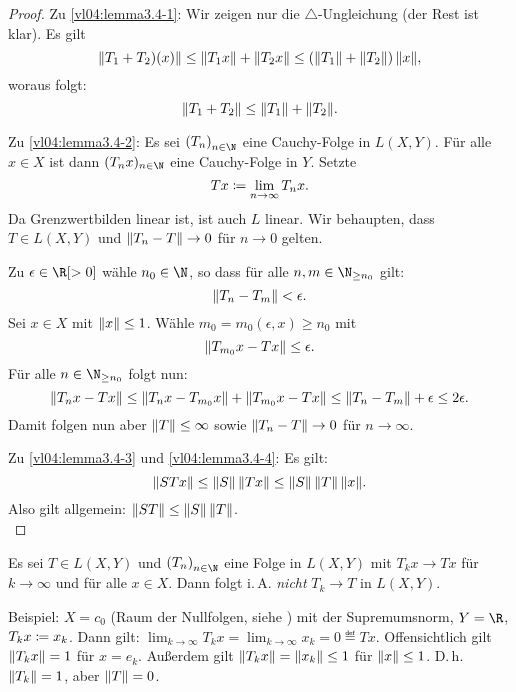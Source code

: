\begin{proof}
    Zu \ref{vl04:lemma3.4-1}: Wir zeigen nur die $\triangle$-Ungleichung (der
    Rest ist klar). Es gilt
    \[ \lVert T_1+T_2)(x)\rVert \leq \lVert T_1x\rVert + \lVert T_2x\rVert
        \leq (\lVert T_1\rVert+\lVert T_2\rVert) \, \lVert x\rVert
    , \]
    woraus folgt:
    \[ \lVert T_1+T_2\rVert \leq \lVert T_1\rVert + \lVert T_2\rVert  . \]
    
    Zu \ref{vl04:lemma3.4-2}: Es sei $\nSeq T$ eine Cauchy-Folge in $L(X,Y)$.
    Für alle $x\in X$ ist dann $(T_n x)_{n\in\N}$ eine Cauchy-Folge in $Y$.
    Setzte
    \[ Tx \coloneqq \lim_{n\to\infty} T_n x  . \]
    Da Grenzwertbilden linear ist, ist auch $L$ linear. Wir behaupten, dass
    $T\in L(X,Y)$ und $\lVert T_n-T\rVert\to0$ für $n\to0$ gelten.
    
    Zu $\epsilon\in\R[>0]$ wähle $n_0\in\N$, so dass für alle 
    $n,m\in\N_{\geq n_0}$ gilt:
    \[ \lVert T_n-T_m\rVert < \epsilon  .\]
    Sei $x\in X$ mit $\lVert x\rVert\leq 1$. Wähle $m_0=m_0(\epsilon,x) \geq n_0$ mit
    \[ \lVert T_{m_0} x - Tx\rVert \leq \epsilon . \]
    Für alle $n\in\N_{\geq n_0}$ folgt nun:
    \[ \lVert T_n x -Tx\rVert \leq \lVert T_n x - T_{m_0} x\rVert + \lVert T_{m_0} x - T x\rVert
        \leq \lVert T_n-T_m\rVert + \epsilon \leq 2\epsilon
    . \]
    Damit folgen nun aber $\lVert T\rVert \leq \infty$ sowie $\lVert T_n-T\rVert\to0$ für
    $n\to\infty$.
    
    Zu \ref{vl04:lemma3.4-3} und \ref{vl04:lemma3.4-4}: Es gilt:
    \[ \lVert STx\rVert \leq \lVert S\rVert \, \lVert Tx\rVert \leq \lVert S\rVert\,\lVert T\rVert\,\lVert x\rVert
    . \]
    Also gilt allgemein: $\lVert ST\rVert \leq \lVert S\rVert\,\lVert T\rVert$.
    \\
\end{proof}

\begin{thBemerkung}
    Es sei $T\in L(X,Y)$ und $\nSeq T$ eine Folge in $L(X,Y)$ mit $T_k x\to Tx$
    für $k\to\infty$ und für alle $x\in X$. Dann folgt i.\,A. \emph{nicht}
    $T_k\to T$ in $L(X,Y)$.
    
    Beispiel: $X=c_0$ 
    (Raum der Nullfolgen, 
    siehe )
    mit der Supremumsnorm, $Y=\R$, $T_kx\coloneqq x_k$.
    Dann gilt: $\lim_{k\to\infty} T_kx = \lim_{k\to\infty} x_k = 0 \eqdef Tx$.
    Offensichtlich gilt $\lVert T_kx\rVert=1$ für $x=e_k$.
    Außerdem gilt $\lVert T_kx\rVert = \lVert x_k\rVert \leq 1$ für $\lVert x\rVert\leq 1$. D.\,h.
    $\lVert T_k\rVert=1$, aber $\lVert T\rVert=0$.
\end{thBemerkung}

